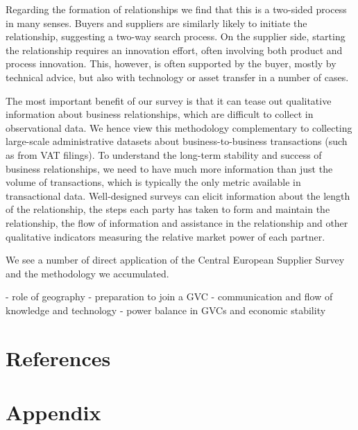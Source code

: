 \usepackage{}\documentclass[final, dvipsnames, authoryear,12pt]{elsarticle}
\begin{document}
Regarding the formation of relationships we find that this is a two-sided process in many senses. Buyers and suppliers are similarly likely to initiate the relationship, suggesting a two-way search process. On the supplier side, starting the relationship requires an innovation effort, often involving both product and process innovation. This, however, is often supported by the buyer, mostly by technical advice, but also with technology or asset transfer in a number of cases.

The most important benefit of our survey is that it can tease out qualitative information about business relationships, which are difficult to collect in observational data. We hence view this methodology complementary to collecting large-scale administrative datasets about business-to-business transactions (such as from VAT filings). To understand the long-term stability and success of business relationships, we need to have much more information than just the volume of transactions, which is typically the only metric available in transactional data. Well-designed surveys can elicit information about the length of the relationship, the steps each party has taken to form and maintain the relationship, the flow of information and assistance in the relationship and other qualitative indicators measuring the relative market power of each partner.

We see a number of direct application of the Central European Supplier Survey and the methodology we accumulated. 

- role of geography
- preparation to join a GVC
- communication and flow of knowledge and technology
- power balance in GVCs and economic stability \cite{still_standing}

\section{References}




\appendix
\section{Appendix}
\end{document}
